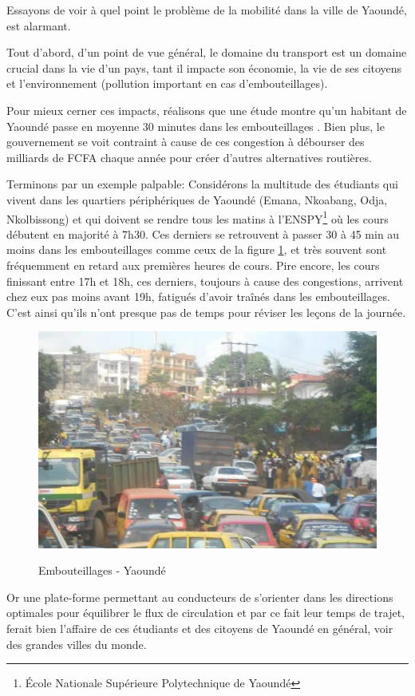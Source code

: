 \documentclass{article}
\begin{document}
Essayons de voir à quel point le problème de la mobilité dans la ville de Yaoundé, est alarmant.

Tout d'abord, d'un point de vue général, le domaine du transport est un domaine crucial dans la vie d'un pays, tant il impacte son économie, la vie de ses citoyens et l'environnement (pollution important en cas d'embouteillages). 

Pour mieux cerner ces impacts, réalisons que une étude montre qu'un habitant de Yaoundé passe en moyenne 30 minutes dans les embouteillages \cite{mfoulou2016mobilite}. Bien plus, le gouvernement se voit contraint à cause de ces congestion à débourser des milliards de FCFA chaque année pour créer d'autres alternatives routières.\cite{237online2022contournement}

Terminons par un exemple palpable: Considérons la multitude des étudiants qui vivent dans les quartiers périphériques de Yaoundé (Emana, Nkoabang, Odja, Nkolbissong) et qui doivent se rendre tous les matins à l'ENSPY\footnote{École Nationale Supérieure Polytechnique de Yaoundé} où les cours débutent en majorité à 7h30. Ces derniers se retrouvent à passer 30 à 45 min au moins dans les embouteillages comme ceux de la figure \ref{fig:embouteillage}, et très souvent sont fréquemment en retard aux premières heures de cours. Pire encore, les cours finissant entre 17h et 18h, ces derniers, toujours à cause des congestions, arrivent chez eux pas moins avant 19h, fatigués d'avoir traînés dans les embouteillages. C'est ainsi qu'ils n'ont presque pas de temps pour réviser les leçons de la journée.

\begin{figure}[h]
    \centering
    \includegraphics[width=0.5\linewidth]{Images/Embouteillage.png}
    \caption{Embouteillages - Yaoundé}
    \label{fig:embouteillage}
    \cite{camerounCirculation}
\end{figure}

Or une plate-forme permettant au conducteurs de s'orienter dans les directions optimales pour équilibrer le flux de circulation et par ce fait leur temps de trajet, ferait bien l'affaire de ces étudiants et des citoyens de Yaoundé en général, voir des grandes villes du monde.
\end{document}
